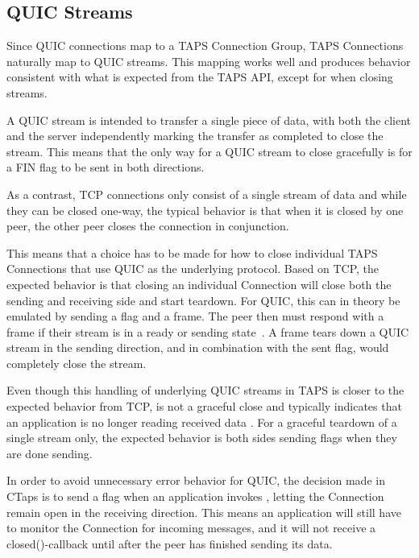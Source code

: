 \subsection{QUIC Streams}\label{sec:quic-streams-under-taps}
Since QUIC connections map to a TAPS Connection Group, TAPS Connections
naturally map to QUIC streams. This mapping works well and produces
behavior consistent with what is expected from the TAPS API, except
for when closing streams.

A QUIC stream is intended to transfer
a single piece of data, with both the client and the server independently marking the transfer
as completed to close the stream.
This means that the only way for a QUIC stream to close gracefully is
for a FIN flag to be sent in both directions.

As a contrast, TCP connections only consist of a single stream of data and
while they can be closed one-way, the typical behavior is that
when it is closed by one peer, the other peer closes the connection
in conjunction.

This means that a choice has to be made for how to close individual
TAPS Connections that use QUIC as the underlying protocol. Based on TCP, the 
expected behavior
is that closing an individual Connection will close both the sending
and receiving side and start teardown. For QUIC, this can in theory be emulated by sending a 
flag and a  frame. The peer then must respond with a 
frame if their stream is in a ready or sending state~\cite[sec.~3.5]{rfc9000}.
A  frame tears down a QUIC stream in the sending direction,
and in combination with the sent  flag, would completely close the stream.

Even though this handling of underlying QUIC streams in TAPS is
closer to the expected behavior from TCP,  is not a graceful close and
typically indicates that an application is no longer reading received data \cite[sec.~3.5]{rfc9000}.
For a graceful teardown of a single
stream only, the expected behavior is both sides sending  flags when
they are done sending.

In order to avoid unnecessary error behavior for QUIC, the decision made
in CTaps is to send a  flag when an application invokes ,
letting the Connection remain open in the receiving direction.
This means an application will still have to monitor the Connection
for incoming messages, and it will not receive  a closed()-callback until
after the peer has finished sending its data.


